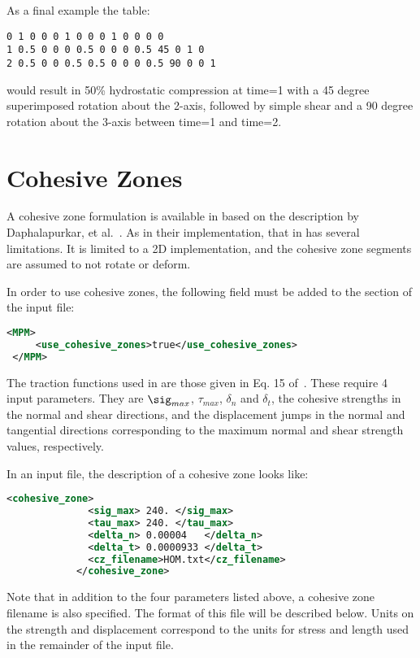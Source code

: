 As a final example the table:
\begin{lstlisting}[backgroundcolor=\color{background}]
0 1 0 0 0 1 0 0 0 1 0 0 0 0
1 0.5 0 0 0 0.5 0 0 0 0.5 45 0 1 0
2 0.5 0 0 0.5 0.5 0 0 0 0.5 90 0 0 1
\end{lstlisting}
would result in 50\% hydrostatic compression at time=1 with a 45 degree superimposed rotation about the 2-axis, followed by  simple shear and a 90 degree rotation about the 3-axis between time=1 and time=2.

\section{Cohesive Zones} \label{Sec:CohesiveZones}
A cohesive zone formulation is available in \Vaango based on the description
by Daphalapurkar, et al.~\cite{Daphalapurkar}.  As in their implementation,
that in \Vaango has several limitations.  It is limited to a 2D implementation,
and the cohesive zone segments are assumed to not rotate or deform.

In order to use cohesive zones, the following field must be added to the
 section of the input file:

\begin{lstlisting}[language=XML]
 <MPM>
     <use_cohesive_zones>true</use_cohesive_zones>
 </MPM>
\end{lstlisting}

The traction functions used in \Vaango are those given in Eq. 15
of~\cite{Daphalapurkar}.  These require 4 input parameters.  They are
$\sig_{max}$, $\tau_{max}$, $\delta_n$ and $\delta_t$, the cohesive strengths
in the normal and shear directions, and the displacement jumps in the normal and
tangential directions corresponding to the maximum normal and shear strength
values, respectively.

In an input file, the description of a cohesive zone looks like:

\begin{lstlisting}[language=XML]
            <cohesive_zone>
              <sig_max> 240. </sig_max>
              <tau_max> 240. </tau_max>
              <delta_n> 0.00004   </delta_n>
              <delta_t> 0.0000933 </delta_t>
              <cz_filename>HOM.txt</cz_filename>
            </cohesive_zone>
\end{lstlisting}

Note that in addition to the four parameters listed above, a cohesive zone
filename is also specified.  The format of this file will be described below.
Units on the strength and displacement correspond to the units for
stress and length used in the remainder of the input file.

